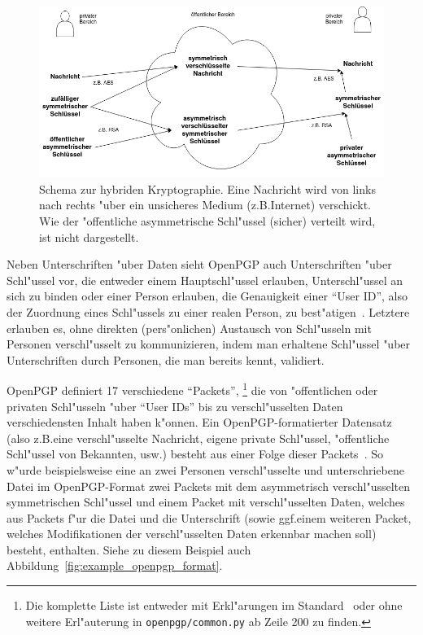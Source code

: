 \documentclass[12pt]{article}
\begin{document}
\begin{figure}
    \includegraphics[width=\textwidth]{hybrid.png}
    \caption{Schema zur hybriden Kryptographie.
    Eine Nachricht wird von links nach rechts "uber ein unsicheres Medium (z.B.\@ Internet) verschickt.
    Wie der "offentliche asymmetrische Schl"ussel (sicher) verteilt wird, ist nicht dargestellt.}
    \label{fig:hybrid_crypto}
\end{figure}

Neben Unterschriften "uber Daten sieht OpenPGP auch Unterschriften "uber Schl"us\-sel vor,
die entweder einem Hauptschl"ussel erlauben, Unterschl"ussel an sich zu binden oder
einer Person erlauben, die Genauigkeit einer "`User ID"', also der Zuordnung eines Schl"ussels
zu einer realen Person, zu best"atigen~\cite{rfc4480}.
Letztere erlauben es, ohne direkten (pers"onlichen) Austausch von Schl"usseln mit Personen
verschl"usselt zu kommunizieren, indem man erhaltene Schl"ussel "uber Unterschriften
durch Personen, die man bereits kennt, validiert.

OpenPGP definiert 17 verschiedene "`Packets"',%
\footnote{Die komplette Liste ist entweder mit Erkl"arungen im Standard~\cite{rfc4480}
oder ohne weitere Erl"auterung in \texttt{openpgp/common.py} ab Zeile 200 zu finden.}
die von "offentlichen oder privaten Schl"usseln "uber
"`User IDs"' bis zu verschl"usselten Daten verschiedensten Inhalt haben k"onnen.
Ein OpenPGP-formatierter Datensatz (also z.B.\@ eine verschl"usselte Nachricht, eigene private Schl"ussel,
"offentliche Schl"ussel von Bekannten, usw.\@) be\-steht aus einer Folge dieser Packets~\cite{rfc4480}.
So w"urde beispielsweise eine an zwei Personen verschl"usselte und unterschriebene Datei im OpenPGP-Format
zwei Packets mit dem asymmetrisch verschl"usselten symmetrischen Schl"ussel und einem Packet mit
verschl"usselten Daten, welches aus Packets f"ur die Datei und die Unterschrift
(sowie ggf.\@ einem weiteren Packet, welches Modifikationen der verschl"usselten Daten erkennbar machen soll)
besteht, enthalten.
Siehe zu diesem Beispiel auch Abbildung~\ref{fig:example_openpgp_format}.
\end{document}
